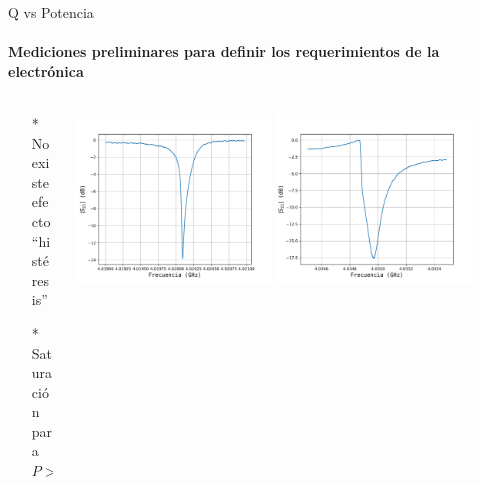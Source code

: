 \documentclass[ignorenonframetext,12pt]{beamer}
\begin{document}
%
\begin{frame}{Q vs Potencia}
				\framesubtitle{Mediciones preliminares para definir los requerimientos
				de la electrónica}
				\begin{columns}
								\begin{column}{0.35\textwidth}
				\footnotesize{\begin{itemize}
								\item[*] No existe efecto ``histéresis'' 
								\item[*] Saturación para $P > -65\,\text{dB}$
				\end{itemize}}
								\end{column}
								\begin{column}{0.65\textwidth}
												\centering
												\includegraphics[width=0.45\textwidth]{un_resonador0_des_filtro}
												\includegraphics[width=0.45\textwidth]{un_resonador1_des_filtro}
								\end{column}
				\end{columns}


\end{frame}
\end{document}
